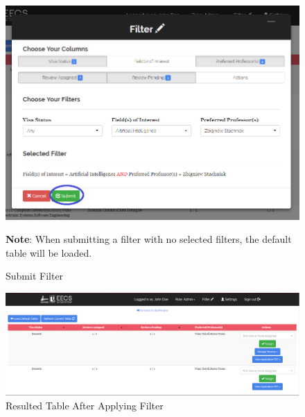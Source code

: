 \documentclass[fontsize=12pt,paper=letter,twoside]{scrartcl}
\begin{document}
\begin{enumerate}
\begin{figure}[!htb]
\begin{center}
\includegraphics[width=.99\textwidth]{images/adm/mr/submit_filter.png}
\end{center}
\caption{Submit Filter}
\textbf{Note}: When submitting a filter with no selected filters, the default table will be loaded.
\label{fig:adm/submit_filter}
\end{figure}

\clearpage
\begin{figure}[!htb]
\begin{center}
\includegraphics[width=.99\textwidth]{images/adm/mr/example_filter_table.png}
\end{center}
\caption{Resulted Table After Applying Filter}
\label{fig:adm/resulted_table}
\end{figure}

\end{enumerate}
\end{document}
